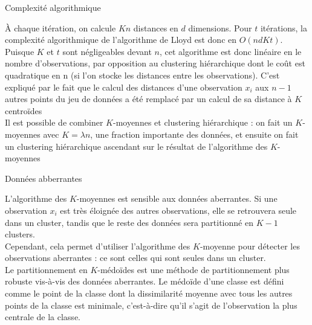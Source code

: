 \documentclass[10pt]{beamer}
\begin{document}
\begin{frame}{Complexité algorithmique}

	À chaque itération, on calcule $K n$ distances en $d$ dimensions. Pour $t$ itérations, la complexité algorithmique de l’algorithme de Lloyd est donc en $O(ndKt)$.\\[1.2em]
	
	Puisque $K$
	et $t$ sont négligeables devant $n$, cet algorithme est donc linéaire en le nombre d’observations, par opposition au clustering hiérarchique dont le coût est quadratique en n (si l'on stocke les distances entre les observations). C'est expliqué par le fait que le calcul des distances d’une observation $x_i$ aux $n-1$ autres points du jeu de données a été remplacé par un calcul de sa distance à $K$ centroïdes\\[1.2em]
	
	Il est possible de combiner $K$-moyennes et clustering hiérarchique : on fait un $K$-moyennes avec $K=\lambda n$, une fraction importante des données, et ensuite on fait un clustering hiérarchique ascendant sur le résultat de l'algorithme des $K$-moyennes\\[1em]
\end{frame}
\begin{frame}{Données abberrantes}
	

	L’algorithme des $K$-moyennes est sensible aux données aberrantes. Si une observation $x_i$ est très éloignée des autres observations, elle se retrouvera seule dans un cluster, tandis que le reste des données sera partitionné en $K - 1$ clusters.\\[1.2em]
	
	Cependant, cela permet d’utiliser l’algorithme des $K$-moyenne pour détecter les observations aberrantes : ce sont celles qui sont seules dans un cluster.\\[2em]
	
	Le partitionnement en $K$-médoïdes est une méthode de partitionnement plus robuste vis-à-vis des données aberrantes. Le médoïde d'une classe est défini comme le point de la classe dont la dissimilarité moyenne avec tous les autres points de la classe est minimale, c'est-à-dire qu'il s'agit de l'observation la plus centrale de la classe.\\[2em]
	
\end{frame}
\end{document}
